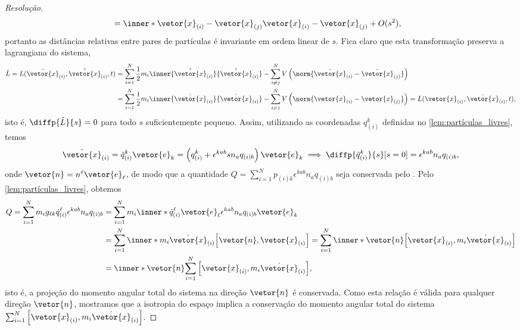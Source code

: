 \begin{proof}[Resolução]
\begin{align*}
                                                                                      &= \inner*{\vetor{x}_{(i)} - \vetor{x}_{(j)}}{\vetor{x}_{(i)} - \vetor{x}_{(j)}} + O(s^2),
    \end{align*}
    portanto as distâncias relativas entre pares de partículas é invariante em ordem linear de \(s\). Fica claro que esta transformação preserva a lagrangiana do sistema,
    \begin{align*}
        \tilde{L} = L(\tilde{\vetor{x}}_{(i)}, \dot{\tilde{\vetor{x}}}_{(i)}, t) &= \sum_{i = 1}^N \frac12 m_i \inner{\dot{\tilde{\vetor{x}}}_{(i)}}{\dot{\tilde{\vetor{x}}}_{(i)}} - \sum_{i\neq j}^{N} V\left(\norm{\tilde{\vetor{x}}_{(i)} - \tilde{\vetor{x}}_{(j)}}\right)\\
                                                                                 &= \sum_{i = 1}^N \frac12 m_i \inner{\dot{{\vetor{x}}}_{(i)}}{\dot{{\vetor{x}}}_{(i)}} - \sum_{i\neq j}^{N} V\left(\norm{{\vetor{x}}_{(i)} - {\vetor{x}}_{(j)}}\right) = L(\vetor{x}_{(i)}, \dot{\vetor{x}}_{(i)}, t),
    \end{align*}
    isto é, \(\diffp{\tilde{L}}{s} = 0\) para todo \(s\) suficientemente pequeno. Assim, utilizando as coordenadas \(q_{(i)}^k\) definidas no \cref{lem:partículas_livres}, temos
    \begin{equation*}
        \tilde{\vetor{x}}_{(i)} = \tilde{q}_{(i)}^k\vetor{e}_k = \left(q_{(i)}^k + \epsilon^{k ab} s n_a q_{(i)b}\right)\vetor{e}_k \implies \diffp{\tilde{q}_{(i)}^k}{s}[s=0] = \epsilon^{kab} n_a q_{(i)b},
    \end{equation*}
    onde \(\vetor{n} = n^\ell \vetor{e}_\ell\), de modo que a quantidade \(Q = \sum_{i = 1}^N p_{(i)k} \epsilon^{kab}n_a q_{(i)b}\) seja conservada pelo . Pelo \cref{lem:partículas_livres}, obtemos
    \begin{align*}
        Q = \sum_{i = 1}^N m_i g_{\ell k} \dot{q}_{(i)}^\ell \epsilon^{kab} n_aq_{(i)b} &= \sum_{i =1}^N m_i \inner*{\dot{q}_{(i)}^\ell\vetor{e}_\ell}{\epsilon^{kab}n_aq_{(i)b} \vetor{e}_k}\\
          &= \sum_{i = 1}^N \inner*{m_i\dot{\vetor{x}}_{(i)}}{\left[\vetor{n}, \vetor{x}_{(i)}\right]} = \sum_{i = 1}^N \inner*{\vetor{n}}{\left[\vetor{x}_{(i)}, m_i\dot{\vetor{x}}_{(i)}\right]}\\
          &= \inner*{\vetor{n}}{\sum_{i = 1}^N\left[\vetor{x}_{(i)}, m_i\dot{\vetor{x}}_{(i)}\right]},
    \end{align*}
    isto é, a projeção do momento angular total do sistema na direção \(\vetor{n}\) é conservada. Como esta relação é válida para qualquer direção \(\vetor{n}\), mostramos que a isotropia do espaço implica a conservação do momento angular total do sistema \(\sum_{i = 1}^N \left[\vetor{x}_{(i)}, m_i \dot{\vetor{x}}_{(i)}\right]\).
\end{proof}
